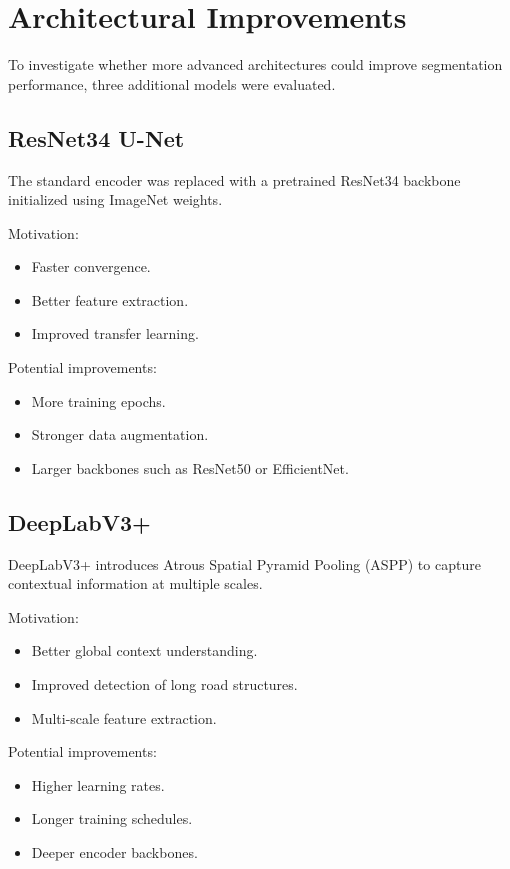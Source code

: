\documentclass[12pt]{article}
\begin{document}
\section{Architectural Improvements}

To investigate whether more advanced architectures could improve segmentation performance, three additional models were evaluated.

\subsection{ResNet34 U-Net}

The standard encoder was replaced with a pretrained ResNet34 backbone initialized using ImageNet weights.

Motivation:

\begin{itemize}
\item Faster convergence.
\item Better feature extraction.
\item Improved transfer learning.
\end{itemize}

Potential improvements:

\begin{itemize}
\item More training epochs.
\item Stronger data augmentation.
\item Larger backbones such as ResNet50 or EfficientNet.
\end{itemize}

\subsection{DeepLabV3+}

DeepLabV3+ introduces Atrous Spatial Pyramid Pooling (ASPP) to capture contextual information at multiple scales.

Motivation:

\begin{itemize}
\item Better global context understanding.
\item Improved detection of long road structures.
\item Multi-scale feature extraction.
\end{itemize}

Potential improvements:

\begin{itemize}
\item Higher learning rates.
\item Longer training schedules.
\item Deeper encoder backbones.
\end{itemize}
\end{document}
